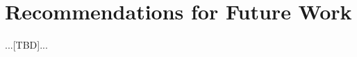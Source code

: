 \chapter{Recommendations for Future Work}
\label{chap:recommendations}
\graphicspath{{Recommendations/Images/}}

...[TBD]...
